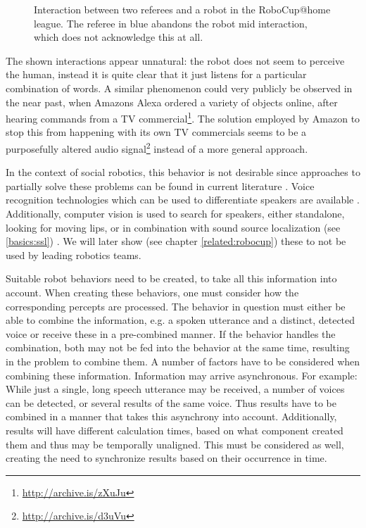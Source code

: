 \begin{figure}[]
	\caption{Interaction between two referees and a robot in the RoboCup@home league.
		The referee in blue abandons the robot mid interaction, which does not acknowledge this at all.}
	\label{pic:moti:imustgonow}
\end{figure}

The shown interactions appear unnatural:
the robot does not seem to perceive the human, instead it is quite clear that it just listens for a particular combination of words.
A similar phenomenon could very publicly be observed in the near past, when Amazons Alexa ordered a variety of objects online, after hearing commands from a  TV commercial\footnote{\url{http://archive.is/zXuJu}}.
The solution employed by Amazon to stop this from happening with its own TV commercials seems to be a purposefully altered audio signal\footnote{\url{http://archive.is/d3uVu}} instead of a more general approach.

In the context of social robotics, this behavior is not desirable since approaches to partially solve these problems can be found in current literature \cite{opdenAkker:2009:YAR:1708376.1708379}.
Voice recognition technologies which can be used to differentiate speakers are available \cite{DBLP:journals/corr/abs-1003-4083}.
Additionally, computer vision is used to search for speakers, either standalone, looking for moving lips, or in combination with sound source localization (see \ref{basics:ssl}) \cite{1048137,lookwhostalking,840663,whosaidthat}.
We will later show (see chapter \ref{related:robocup}) these to not be used by leading robotics teams.

Suitable robot behaviors need to be created, to take all this information into account.
When creating these behaviors, one must consider how the corresponding percepts are processed.
The behavior in question must either be able to combine the information, e.g. a spoken utterance and a distinct, detected voice or receive these in a pre-combined manner.
If the behavior handles the combination, both may not be fed into the behavior at the same time, resulting in the problem to combine them.
A number of factors have to be considered when combining these information.
Information may arrive asynchronous.
For example: While just a single, long speech utterance may be received, a number of voices can be detected, or several results of the same voice.
Thus results have to be combined in a manner that takes this asynchrony into account.
Additionally, results will have different calculation times, based on what component created them and thus may be temporally unaligned.
This must be considered as well, creating the need to synchronize results based on their occurrence in time.

